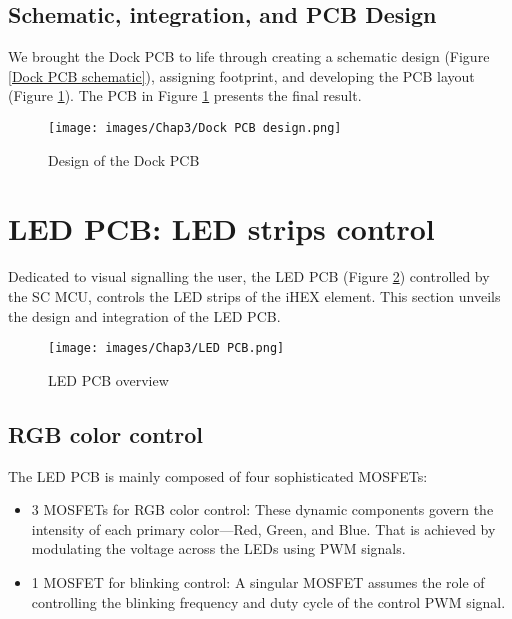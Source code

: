 \subsection{Schematic, integration, and PCB Design}

We brought the Dock PCB to life through creating a schematic design (Figure \ref{Dock PCB schematic}), assigning footprint, and developing the PCB layout (Figure \ref{Dock PCB design}). The PCB in Figure \ref{Dock PCB design} presents the final result.

\begin{figure}[H]
\begin{center}
\texttt{[image: images/Chap3/Dock PCB design.png]}\\
\caption{Design of the Dock PCB}
\label{Dock PCB design}
\end{center}
\end{figure}

\section{LED PCB: LED strips control}

Dedicated to visual signalling the user, the LED PCB (Figure \ref{LED PCB overview}) controlled by the SC MCU, controls the LED strips of the  iHEX element. This section unveils the design and integration of the LED PCB.

\begin{figure}[H]
\begin{center}
\texttt{[image: images/Chap3/LED PCB.png]}\\
\caption{LED PCB overview}
\label{LED PCB overview}
\end{center}
\end{figure}

\subsection{RGB color control}

The LED PCB is mainly composed of four sophisticated MOSFETs:

\begin{itemize}
    \item 3 MOSFETs for RGB color control: These dynamic components govern the intensity of each primary color—Red, Green, and Blue. That is achieved by modulating the voltage across the LEDs using PWM signals.
    \item 1 MOSFET for blinking control: A singular MOSFET assumes the role of controlling the blinking frequency and duty cycle of the control PWM signal.
\end{itemize}

